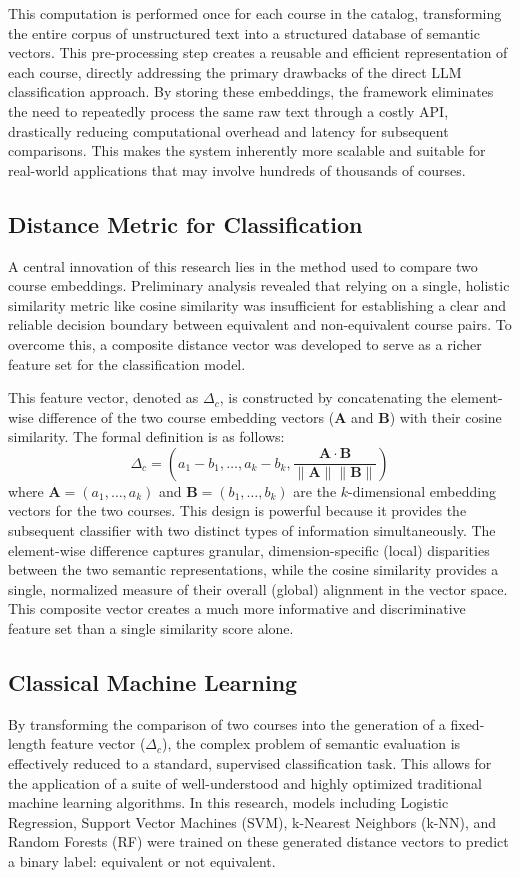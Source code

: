 \begin{introduction}
This computation is performed once for each course in the catalog, transforming the entire corpus of unstructured text into a structured database of semantic vectors. This pre-processing step creates a reusable and efficient representation of each course, directly addressing the primary drawbacks of the direct LLM classification approach. By storing these embeddings, the framework eliminates the need to repeatedly process the same raw text through a costly API, drastically reducing computational overhead and latency for subsequent comparisons. This makes the system inherently more scalable and suitable for real-world applications that may involve hundreds of thousands of courses.

\subsection{Distance Metric for Classification}
A central innovation of this research lies in the method used to compare two course embeddings. Preliminary analysis revealed that relying on a single, holistic similarity metric like cosine similarity was insufficient for establishing a clear and reliable decision boundary between equivalent and non-equivalent course pairs. To overcome this, a composite distance vector was developed to serve as a richer feature set for the classification model.

This feature vector, denoted as \(\Delta_c\), is constructed by concatenating the element-wise difference of the two course embedding vectors (\(\mathbf{A}\) and \(\mathbf{B}\)) with their cosine similarity. The formal definition is as follows:
\[ \Delta_c = \left(a_1 - b_1, \dots, a_k - b_k, \frac{\mathbf{A}\cdot\mathbf{B}}{\parallel \mathbf{A} \parallel \parallel \mathbf{B} \parallel } \right) \]
where \(\mathbf{A} = (a_1, \dots, a_k) \) and \(\mathbf{B} = (b_1, \dots, b_k) \) are the \(k\)-dimensional embedding vectors for the two courses.  This design is powerful because it provides the subsequent classifier with two distinct types of information simultaneously. The element-wise difference captures granular, dimension-specific (local) disparities between the two semantic representations, while the cosine similarity provides a single, normalized measure of their overall (global) alignment in the vector space. This composite vector creates a much more informative and discriminative feature set than a single similarity score alone.

\subsection{Classical Machine Learning}
By transforming the comparison of two courses into the generation of a fixed-length feature vector (\(\Delta_c\)), the complex problem of semantic evaluation is effectively reduced to a standard, supervised classification task. This allows for the application of a suite of well-understood and highly optimized traditional machine learning algorithms. In this research, models including Logistic Regression, Support Vector Machines (SVM), k-Nearest Neighbors (k-NN), and Random Forests (RF) were trained on these generated distance vectors to predict a binary label: equivalent or not equivalent.


\end{introduction}
